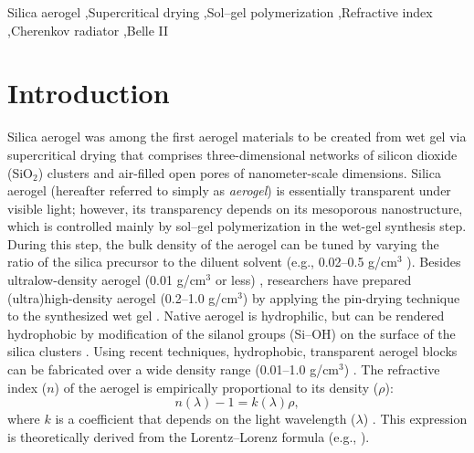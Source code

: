 \documentclass[5p,twocolumn]{elsarticle}
\begin{document}
\begin{frontmatter}
\begin{keyword}
Silica aerogel \sep Supercritical drying \sep Sol--gel polymerization \sep Refractive index \sep Cherenkov radiator \sep Belle II

\end{keyword}

\end{frontmatter}



\section{Introduction}
\label{1}

Silica aerogel was among the first aerogel materials to be created from wet gel via supercritical drying \cite{cite1} that comprises three-dimensional networks of silicon dioxide (SiO$_2$) clusters and air-filled open pores of nanometer-scale dimensions. Silica aerogel (hereafter referred to simply as \textit{aerogel}) is essentially transparent under visible light; however, its transparency depends on its mesoporous nanostructure, which is controlled mainly by sol--gel polymerization in the wet-gel synthesis step. During this step, the bulk density of the aerogel can be tuned by varying the ratio of the silica precursor to the diluent solvent (e.g., 0.02--0.5 g/cm$^3$ \cite{cite2}). Besides ultralow-density aerogel (0.01 g/cm$^3$ or less) \cite{cite3,cite4}, researchers have prepared (ultra)high-density aerogel (0.2--1.0 g/cm$^3$) by applying the pin-drying technique to the synthesized wet gel \cite{cite4}. Native aerogel is hydrophilic, but can be rendered hydrophobic by modification of the silanol groups (Si--OH) on the surface of the silica clusters \cite{cite2,cite5}. Using recent techniques, hydrophobic, transparent aerogel blocks can be fabricated over a wide density range (0.01--1.0 g/cm$^3$) \cite{cite4}. The refractive index ($n$) of the aerogel is empirically proportional to its density ($\rho $):
\begin{equation}
\label{eq:eq1}
n(\lambda )-1=k(\lambda )\rho,
\end{equation}
where $k$ is a coefficient that depends on the light wavelength ($\lambda $) \cite{cite2}. This expression is theoretically derived from the Lorentz--Lorenz formula (e.g., \cite{cite6}).
\end{document}
